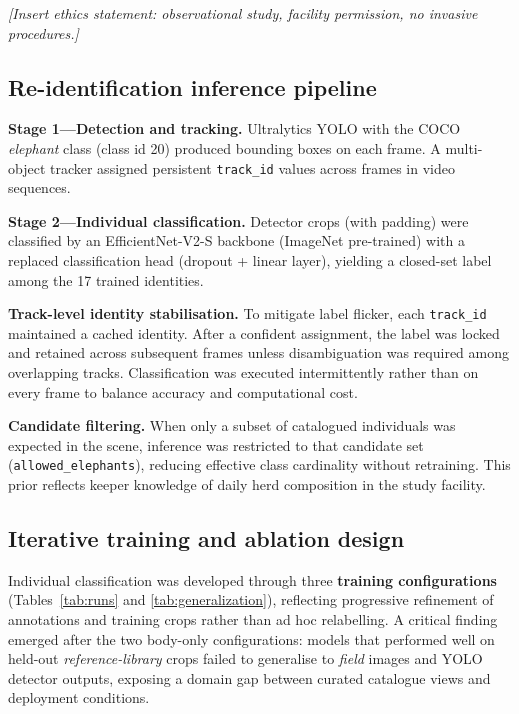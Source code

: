 \documentclass[preprint,12pt,3p,times]{elsarticle}
\begin{document}
\textit{[Insert ethics statement: observational study, facility permission, no invasive procedures.]}

\subsection{Re-identification inference pipeline}

\textbf{Stage 1---Detection and tracking.} Ultralytics YOLO with the COCO \textit{elephant} class (class id 20) produced bounding boxes on each frame. A multi-object tracker assigned persistent \texttt{track\_id} values across frames in video sequences.

\textbf{Stage 2---Individual classification.} Detector crops (with padding) were classified by an EfficientNet-V2-S backbone (ImageNet pre-trained) with a replaced classification head (dropout + linear layer), yielding a closed-set label among the 17 trained identities.

\textbf{Track-level identity stabilisation.} To mitigate label flicker, each \texttt{track\_id} maintained a cached identity. After a confident assignment, the label was locked and retained across subsequent frames unless disambiguation was required among overlapping tracks. Classification was executed intermittently rather than on every frame to balance accuracy and computational cost.

\textbf{Candidate filtering.} When only a subset of catalogued individuals was expected in the scene, inference was restricted to that candidate set (\texttt{allowed\_elephants}), reducing effective class cardinality without retraining. This prior reflects keeper knowledge of daily herd composition in the study facility.

\subsection{Iterative training and ablation design}

Individual classification was developed through three \textbf{training configurations} (Tables~\ref{tab:runs} and \ref{tab:generalization}), reflecting progressive refinement of annotations and training crops rather than ad hoc relabelling. A critical finding emerged after the two body-only configurations: models that performed well on held-out \emph{reference-library} crops failed to generalise to \emph{field} images and YOLO detector outputs, exposing a domain gap between curated catalogue views and deployment conditions.
\end{document}

